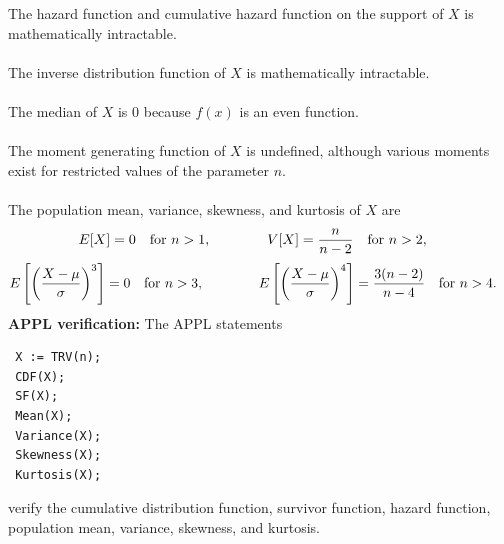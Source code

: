 \documentclass[12pt,fullpage]{article}
\begin{document}
The hazard function and cumulative hazard function on the support of $X$ is mathematically intractable.\\
\\
The inverse distribution function of $X$ is mathematically intractable.\\
\\
The median of $X$ is $0$ because $f(x)$ is an even function.\\
\\
The moment generating function of $X$ is undefined, although various
moments exist for restricted values of the parameter $n$.\\
\\
The population mean, variance, skewness, and kurtosis of $X$ are
$$
E[X] = 0 \quad  {\rm for} \ n > 1, \qquad \qquad
V[X] = \frac{n}{n-2} \quad {\rm for} \ n > 2, \quad 
$$
$$
E\left[ \left( \frac{X - \mu}{\sigma} \right) ^ 3 \right] = 0 \quad  {\rm for} \ n > 3,\qquad \qquad
E\left[ \left( \frac{X - \mu}{\sigma} \right) ^ 4 \right] = \frac{3(n-2)}{n-4} \quad {\rm for} \  n > 4.\quad
$$
\noindent
{\bf APPL verification:}
The APPL statements
\begin{verbatim}
 X := TRV(n);
 CDF(X);
 SF(X);
 Mean(X);
 Variance(X);
 Skewness(X);
 Kurtosis(X);
\end{verbatim}
verify the cumulative distribution function, survivor function, hazard function,
population mean, variance, skewness, and kurtosis.
\end{document}
